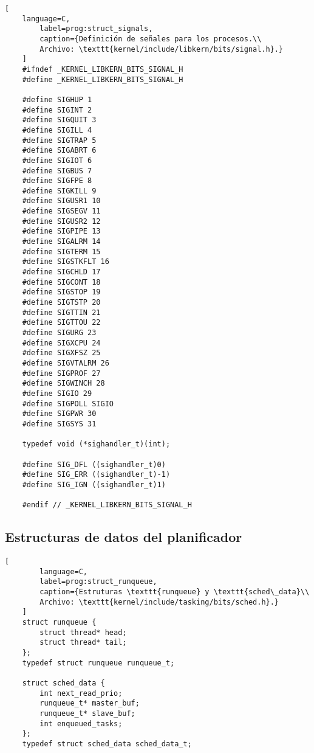 \begin{lstlisting}[
	language=C,
		label=prog:struct_signals,
		caption={Definición de señales para los procesos.\\
		Archivo: \texttt{kernel/include/libkern/bits/signal.h}.}
	]
	#ifndef _KERNEL_LIBKERN_BITS_SIGNAL_H
	#define _KERNEL_LIBKERN_BITS_SIGNAL_H
	
	#define SIGHUP 1
	#define SIGINT 2
	#define SIGQUIT 3
	#define SIGILL 4
	#define SIGTRAP 5
	#define SIGABRT 6
	#define SIGIOT 6
	#define SIGBUS 7
	#define SIGFPE 8
	#define SIGKILL 9
	#define SIGUSR1 10
	#define SIGSEGV 11
	#define SIGUSR2 12
	#define SIGPIPE 13
	#define SIGALRM 14
	#define SIGTERM 15
	#define SIGSTKFLT 16
	#define SIGCHLD 17
	#define SIGCONT 18
	#define SIGSTOP 19
	#define SIGTSTP 20
	#define SIGTTIN 21
	#define SIGTTOU 22
	#define SIGURG 23
	#define SIGXCPU 24
	#define SIGXFSZ 25
	#define SIGVTALRM 26
	#define SIGPROF 27
	#define SIGWINCH 28
	#define SIGIO 29
	#define SIGPOLL SIGIO
	#define SIGPWR 30
	#define SIGSYS 31
	
	typedef void (*sighandler_t)(int);
	
	#define SIG_DFL ((sighandler_t)0)
	#define SIG_ERR ((sighandler_t)-1)
	#define SIG_IGN ((sighandler_t)1)
	
	#endif // _KERNEL_LIBKERN_BITS_SIGNAL_H
\end{lstlisting}





\newpage
\subsection{Estructuras de datos del planificador}

\begin{lstlisting}[
		language=C,
		label=prog:struct_runqueue,
		caption={Estruturas \texttt{runqueue} y \texttt{sched\_data}\\
		Archivo: \texttt{kernel/include/tasking/bits/sched.h}.}
	]
	struct runqueue {
		struct thread* head;
		struct thread* tail;
	};
	typedef struct runqueue runqueue_t;
	
	struct sched_data {
		int next_read_prio;
		runqueue_t* master_buf;
		runqueue_t* slave_buf;
		int enqueued_tasks;
	};
	typedef struct sched_data sched_data_t;
\end{lstlisting}

